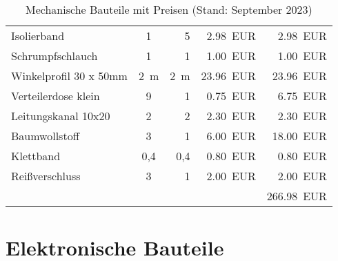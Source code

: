 \documentclass[./00PhotoBox.tex]{subfiles}
\begin{document}
\begin{table}[ht]
\begin{tabular}{l|c|r|r|r}
        Isolierband                   & 1                & 5                & \SI{2,98}{EUR}       & \SI{2,98}{EUR}   \\
        Schrumpfschlauch              & 1                & 1                & \SI{1,00}{EUR}       & \SI{1,00}{EUR}   \\
        Winkelprofil 30 x 50mm        & \SI{2}{\metre}   & \SI{2}{\metre}   & \SI{23,96}{EUR}      & \SI{23,96}{EUR}  \\
        Verteilerdose klein           & 9                & 1                & \SI{0,75}{EUR}       & \SI{6,75}{EUR}   \\
        Leitungskanal 10x20           & 2                & 2                & \SI{2,30}{EUR}       & \SI{2,30}{EUR}   \\
        Baumwollstoff                 & 3                & 1                & \SI{6,00}{EUR}       & \SI{18,00}{EUR}  \\
        Klettband                     & 0,4              & 0,4              & \SI{0,80}{EUR}       & \SI{0,80}{EUR}   \\
        Reißverschluss                & 3                & 1                & \SI{2,00}{EUR}       & \SI{2,00}{EUR}   \\
                                      &                  &                  &                      & \SI{266,98}{EUR} \\
    \end{tabular}
    \caption{Mechanische Bauteile mit Preisen (Stand: September 2023)}
    \label{tab:bauteile_mechanisch}
\end{table}

\clearpage

\section{Elektronische Bauteile}
\end{document}
